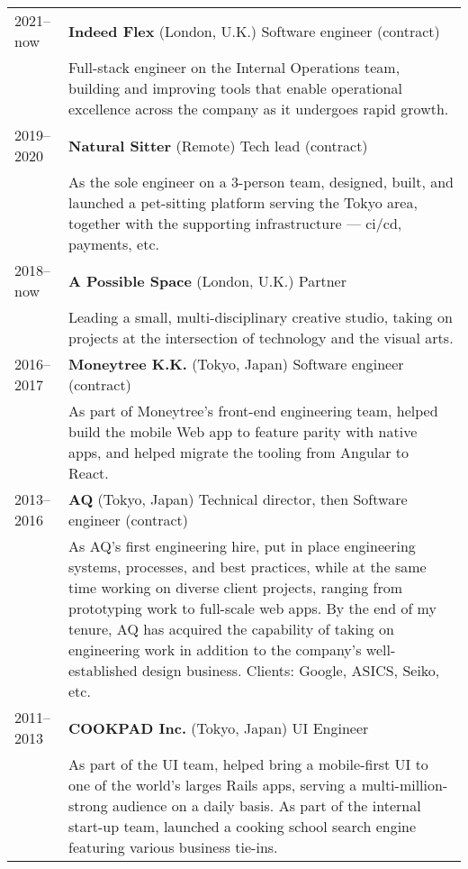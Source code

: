 \documentclass[a4paper,11pt]{article}
\def\companystrut{\rule{0pt}{1.2\normalbaselineskip}}
\def\descriptionstrut{\rule{0pt}{0.9\normalbaselineskip}}
\begin{document}
\begin{tabular}{ p{4.5em} p{41.5em} }
  2021–now & \textbf{Indeed Flex} (London, U.K.) Software engineer (contract)\\
           & \descriptionstrut Full-stack engineer on the Internal Operations team,
             building and improving tools that enable operational excellence across the
             company as it undergoes rapid growth.\\

  2019–2020\companystrut & \textbf{Natural Sitter} (Remote) Tech lead (contract)\\
           & \descriptionstrut As the sole engineer on a 3-person team, designed, built,
             and launched a pet-sitting platform serving the Tokyo area, together with the
             supporting infrastructure — {\sc ci/cd}, payments, etc.\\

  2018–now\companystrut & \textbf{A Possible Space} (London, U.K.) Partner\\
           & \descriptionstrut Leading a small, multi-disciplinary creative studio,
             taking on projects at the intersection of technology and the visual arts.\\

  2016–2017\companystrut & \textbf{Moneytree K.K.} (Tokyo, Japan) Software engineer (contract)\\
           & \descriptionstrut As part of Moneytree’s front-end engineering team, helped
             build the mobile Web app to feature parity with native apps, and helped migrate
             the tooling from Angular to React.\\

  2013–2016\companystrut & \textbf{AQ} (Tokyo, Japan) Technical director, {\sc then} Software engineer (contract)\\
           & \descriptionstrut As AQ’s first engineering hire, put in place engineering
             systems, processes, and best practices, while at the same time working on
             diverse client projects, ranging from prototyping work to full-scale web apps.
             By the end of my tenure, AQ has acquired the capability of taking on engineering
             work in addition to the company’s well-established design business. Clients:
             Google, ASICS, Seiko, etc.\\

  2011–2013\companystrut & \textbf{COOKPAD Inc.} (Tokyo, Japan) UI Engineer\\
           & \descriptionstrut As part of the UI team, helped bring a mobile-first UI to
             one of the world’s larges Rails apps, serving a multi-million-strong audience on
             a daily basis. As part of the internal start-up team, launched a cooking school
             search engine featuring various business tie-ins.\\


\end{tabular}
\end{document}
